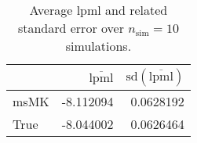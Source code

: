 \begin{table}[H]

\caption{Average lpml and related standard error over $n_{\text{sim}} = 10$ simulations.}
\centering
\begin{tabular}[t]{lrr}
\toprule
  & $\overbar{\text{lpml}}$ & $\text{sd}(\overbar{\text{lpml}})$\\
\midrule
msMK & -8.112094 & 0.0628192\\
True & -8.044002 & 0.0626464\\
\bottomrule
\end{tabular}
\end{table}